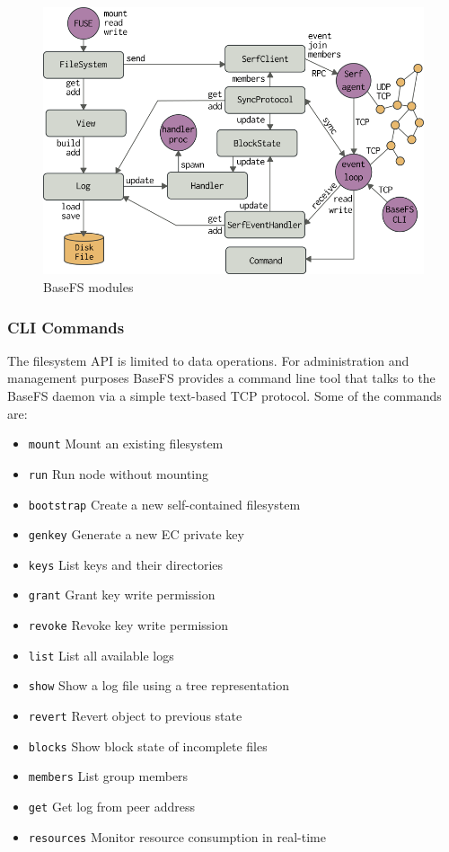 \documentclass{sig-alternate}
\begin{document}
\begin{figure}
\centering
\includegraphics[width=\columnwidth]{imgs/modules.png}
\caption{BaseFS modules}
\label{fig:modules}
\end{figure}

\subsubsection{CLI Commands}
The filesystem API is limited to data operations. For administration and management purposes BaseFS provides a command line tool that talks to the BaseFS daemon via a simple text-based TCP protocol. Some of the commands are:

\begin{itemize}
 \item \texttt{mount}	Mount an existing filesystem
 \item \texttt{run}	Run node without mounting
 \item \texttt{bootstrap}	Create a new self-contained filesystem
 \item \texttt{genkey}	Generate a new EC private key
 \item \texttt{keys}	List keys and their directories
 \item \texttt{grant}	Grant key write permission
 \item \texttt{revoke}	Revoke key write permission
 \item \texttt{list}	List all available logs
 \item \texttt{show}	Show a log file using a tree representation
 \item \texttt{revert}	Revert object to previous state
 \item \texttt{blocks}	Show block state of incomplete files
 \item \texttt{members}	List group members
 \item \texttt{get}		Get log from peer address
 \item \texttt{resources}	Monitor resource consumption in real-time
\end{itemize}
\end{document}
